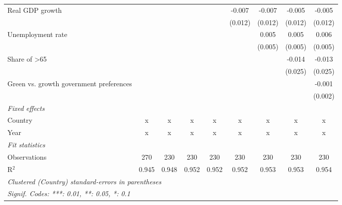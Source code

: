 \begin{table}[htbp]
\begin{tabular}{lcccccccc}
      Real GDP growth                                                  &         &         &               &               & -0.007        & -0.007        & -0.005        & -0.005\\   
                                                                       &         &         &               &               & (0.012)       & (0.012)       & (0.012)       & (0.012)\\   
      Unemployment rate                                                &         &         &               &               &               & 0.005         & 0.005         & 0.006\\   
                                                                       &         &         &               &               &               & (0.005)       & (0.005)       & (0.005)\\   
      Share of >65                                                     &         &         &               &               &               &               & -0.014        & -0.013\\   
                                                                       &         &         &               &               &               &               & (0.025)       & (0.025)\\   
      Green vs. growth government preferences                          &         &         &               &               &               &               &               & -0.001\\   
                                                                       &         &         &               &               &               &               &               & (0.002)\\   
      \emph{Fixed effects}\\
      Country                                                          & x       & x       & x             & x             & x             & x             & x             & x\\  
      Year                                                             & x       & x       & x             & x             & x             & x             & x             & x\\  
      \midrule \emph{Fit statistics}\\
      Observations                                                     & 270     & 230     & 230           & 230           & 230           & 230           & 230           & 230\\  
      R$^2$                                                            & 0.945   & 0.948   & 0.952         & 0.952         & 0.952         & 0.953         & 0.953         & 0.954\\  
      \midrule
      \multicolumn{9}{l}{\emph{Clustered (Country) standard-errors in parentheses}}\\
      \multicolumn{9}{l}{\emph{Signif. Codes: ***: 0.01, **: 0.05, *: 0.1}}\\
   \end{tabular}
\end{table}


